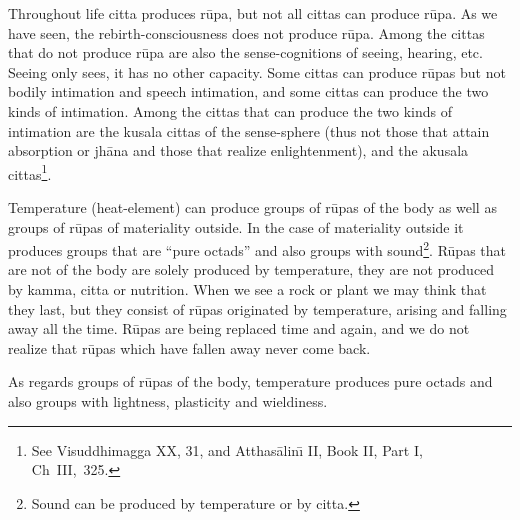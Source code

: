 \documentclass{book}
\begin{document}
Throughout life citta produces r\=upa, but not all cittas can produce
r\=upa. As we have seen, the rebirth-consciousness does not produce
r\=upa. Among the cittas that do not produce r\=upa are also the
sense-cognitions of seeing, hearing, etc. Seeing only sees, it has no
other capacity. Some cittas can produce r\=upas but not bodily
intimation and speech intimation, and some cittas can produce the two
kinds of intimation. Among the cittas that can produce the two kinds of
intimation are the kusala cittas of the sense-sphere (thus not those
that attain absorption or jh{\=a}na and those that realize
enlightenment), and the akusala cittas\footnote{See
Visuddhimagga XX, 31, and Atthas{\=a}lin\=\i{}  II, Book II,  Part I,
\mbox{Ch III, 325.}}. 

Temperature (heat-element) can produce groups of r\=upas of the body
as well as groups of r\=upas of materiality outside. In the case of
materiality outside it produces groups that are ``pure octads'' and
also groups with sound\footnote{Sound can be produced by temperature
or by citta.}. R\=upas that are not of the body are solely produced by
temperature, they are not produced by kamma, citta or nutrition. When
we see a rock or plant we may think that they last, but they consist of
r\=upas originated by temperature, arising and falling away all the
time. R\=upas are being replaced time and again, and we do not realize
that r\=upas which have fallen away never come back.

As regards groups of r\=upas of the body, temperature produces pure
octads and also groups with lightness, plasticity and wieldiness. 
\end{document}
